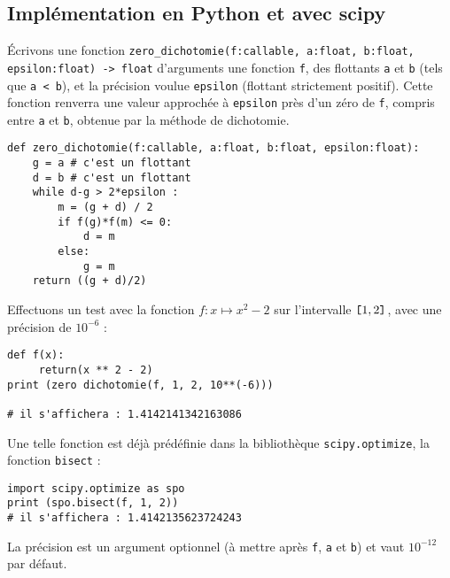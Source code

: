 \subsection{Implémentation en Python et avec scipy}
\'Ecrivons une fonction \lstinline{zero_dichotomie(f:callable, a:float, b:float, epsilon:float) -> float} d'arguments une fonction \lstinline{f}, des flottants \lstinline{a} et \lstinline{b} (tels que \lstinline{a < b}), et  la précision voulue \lstinline{epsilon} (flottant strictement positif). Cette fonction renverra une valeur approchée à \lstinline{epsilon} près d'un zéro de \lstinline{f}, compris entre \lstinline{a} et \lstinline{b}, obtenue par la méthode de dichotomie.

\begin{lstlisting}
def zero_dichotomie(f:callable, a:float, b:float, epsilon:float):
    g = a # c'est un flottant
    d = b # c'est un flottant
    while d-g > 2*epsilon :
        m = (g + d) / 2
        if f(g)*f(m) <= 0:
            d = m
        else:
            g = m
    return ((g + d)/2)
\end{lstlisting}

Effectuons un test avec la fonction $f : x \mapsto x^2-2$ sur l'intervalle $\verb![!1,2\verb!]!$, avec une précision de $10^{-6}$ :
 
\begin{lstlisting}
def f(x):
     return(x ** 2 - 2)
print (zero dichotomie(f, 1, 2, 10**(-6)))

# il s'affichera : 1.4142141342163086
\end{lstlisting}
%
% 

Une telle fonction est déjà prédéfinie dans la bibliothèque \lstinline{scipy.optimize}, la fonction \lstinline{bisect} : 
\begin{lstlisting}
import scipy.optimize as spo
print (spo.bisect(f, 1, 2)) 
# il s'affichera : 1.4142135623724243
\end{lstlisting}
La précision est un argument optionnel (à mettre après \lstinline{f}, \lstinline{a} et \lstinline{b}) et vaut $10^{-12}$ par défaut.

